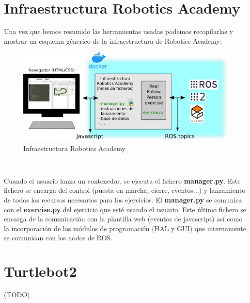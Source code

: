 
\section{Infraestructura Robotics Academy}
\label{sec:infraestructura_robotics_academy}
Una vez que hemos resumido las herramientas usadas podemos recopilarlas y mostrar un esquema génerico de la infraestructura de Robotics Academy:

\begin{figure} [H]
  \begin{center}
    \includegraphics[width=15cm]{imagenes/esquema-robotics-academy.png}
  \end{center}
  \caption{Infraestructura Robotics Academy}
  \label{fig:infraestructura_robotics_academy}
\end{figure}\

Cuando el usuario lanza un contenedor, se ejecuta el fichero \textbf{manager.py}. Este fichero se encarga del control (puesta en marcha, cierre, eventos...) y lanzamiento de todos los recursos necesarios para los ejercicios. El \textbf{manager.py} se comunica con el \textbf{exercise.py} del ejercicio que esté usando el usuario. Este último fichero se encarga de la comunicación con la plantilla web (eventos de javascript) así como la incorporación de los módulos de programación (HAL y GUI) que internamente se comunican con los nodos de ROS.\\



\section{Turtlebot2}
\label{sec:turtlebot2}

(TODO)
